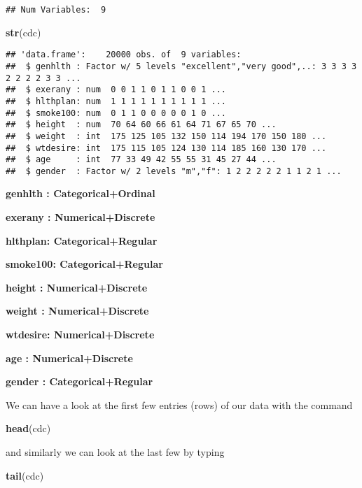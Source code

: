 \documentclass[]{article}
\newenvironment{Shaded}{\begin{snugshade}}{\end{snugshade}}
\newcommand{\KeywordTok}[1]{\textcolor[rgb]{0.13,0.29,0.53}{\textbf{{#1}}}}
\newcommand{\NormalTok}[1]{{#1}}
\begin{document}
\begin{verbatim}
## Num Variables:  9
\end{verbatim}

\begin{Shaded}
\begin{Highlighting}[]
\KeywordTok{str}\NormalTok{(cdc)}
\end{Highlighting}
\end{Shaded}

\begin{verbatim}
## 'data.frame':    20000 obs. of  9 variables:
##  $ genhlth : Factor w/ 5 levels "excellent","very good",..: 3 3 3 3 2 2 2 2 3 3 ...
##  $ exerany : num  0 0 1 1 0 1 1 0 0 1 ...
##  $ hlthplan: num  1 1 1 1 1 1 1 1 1 1 ...
##  $ smoke100: num  0 1 1 0 0 0 0 0 1 0 ...
##  $ height  : num  70 64 60 66 61 64 71 67 65 70 ...
##  $ weight  : int  175 125 105 132 150 114 194 170 150 180 ...
##  $ wtdesire: int  175 115 105 124 130 114 185 160 130 170 ...
##  $ age     : int  77 33 49 42 55 55 31 45 27 44 ...
##  $ gender  : Factor w/ 2 levels "m","f": 1 2 2 2 2 2 1 1 2 1 ...
\end{verbatim}

\textbf{genhlth : Categorical+Ordinal}

\textbf{exerany : Numerical+Discrete}

\textbf{hlthplan: Categorical+Regular}

\textbf{smoke100: Categorical+Regular}

\textbf{height : Numerical+Discrete}

\textbf{weight : Numerical+Discrete}

\textbf{wtdesire: Numerical+Discrete}

\textbf{age : Numerical+Discrete}

\textbf{gender : Categorical+Regular}

We can have a look at the first few entries (rows) of our data with the
command

\begin{Shaded}
\begin{Highlighting}[]
\KeywordTok{head}\NormalTok{(cdc)}
\end{Highlighting}
\end{Shaded}

and similarly we can look at the last few by typing

\begin{Shaded}
\begin{Highlighting}[]
\KeywordTok{tail}\NormalTok{(cdc)}
\end{Highlighting}
\end{Shaded}
\end{document}
